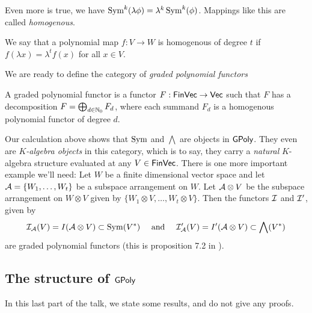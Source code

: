 \documentclass[../main.tex]{subfiles}
\begin{document}
Even more is true, we have $\operatorname{Sym}^k(\lambda \phi) = \lambda^k \operatorname{Sym}^k(\phi)$. 
Mappings like this are called \emph{homogenous}.
\begin{defi}
    We say that a polynomial map $f: V \to W$ is homogenous of degree $t$ if
    $f(\lambda x) = \lambda^t f(x)$ for all $x \in V$.
\end{defi}

We are ready to define the category of \emph{graded polynomial functors}

\begin{defi}
    A graded polynomial functor is a functor $F: \textnormal{$\textsf{FinVec}$} \to \textnormal{$\textsf{Vec}$}$ such that 
    $F$ has a decomposition $F = \bigoplus_{d \in \mathbb{N}_0} F_d$, where 
    each summand $F_d$ is a homogenous polynomial functor of degree $d$.
\end{defi}

Our calculation above shows that $\operatorname{Sym}$ and $\bigwedge$ are objects in $\textnormal{$\textsf{GPoly}$}$. 
They even are \emph{$K$-algebra objects} in this category, which is to say, they 
carry a \emph{natural} $K$-algebra structure evaluated at any $V \in \textnormal{$\textsf{FinVec}$}$.
There is one more important example we'll need: Let $W$ be a finite dimensional vector
space and let $\mathcal{A} = \{W_1,\dots, W_t\}$ be a subspace arrangement on $W$. Let
$\mathcal{A} \otimes V$ be the subspace arrangement on $W \otimes V$ given by 
$\{W_1 \otimes V, \dots, W_t \otimes V\}$. Then the functors $\mathcal{I}$ and $\mathcal{I}'$, given by
\begin{equation*}
    \mathcal{I}_{\mathcal{A}}(V) = I(\mathcal{A} \otimes V) \subset \operatorname{Sym}(V^*) \quad \text{ and } \quad
    \mathcal{I}'_{\mathcal{A}}(V) = I'(\mathcal{A} \otimes V) \subset \bigwedge(V^*)
\end{equation*}
are graded polynomial functors (this is proposition 7.2 in 
\cite{Gandini2019ResOfIdeals}). 

\subsection{The structure of $\textnormal{$\textsf{GPoly}$}$}
In this last part of the talk, we state some results, and do not give any proofs.
\end{document}
